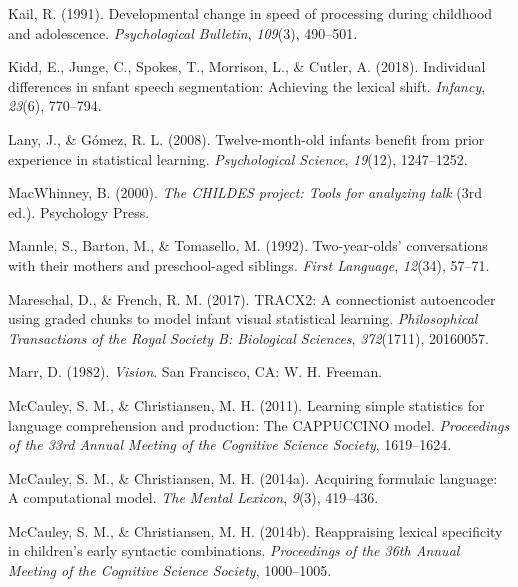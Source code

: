 \documentclass[
  english,
  man,floatsintext]{apa6}
\begin{document}
\leavevmode\hypertarget{ref-kail1991developmental}{}%
Kail, R. (1991). Developmental change in speed of processing during childhood and adolescence. \emph{Psychological Bulletin}, \emph{109}(3), 490--501.

\leavevmode\hypertarget{ref-kidd2018individual}{}%
Kidd, E., Junge, C., Spokes, T., Morrison, L., \& Cutler, A. (2018). Individual differences in snfant speech segmentation: Achieving the lexical shift. \emph{Infancy}, \emph{23}(6), 770--794.

\leavevmode\hypertarget{ref-lany2008twelve}{}%
Lany, J., \& Gómez, R. L. (2008). Twelve-month-old infants benefit from prior experience in statistical learning. \emph{Psychological Science}, \emph{19}(12), 1247--1252.

\leavevmode\hypertarget{ref-childes}{}%
MacWhinney, B. (2000). \emph{The CHILDES project: Tools for analyzing talk} (3rd ed.). Psychology Press.

\leavevmode\hypertarget{ref-mannle1992twoyearolds}{}%
Mannle, S., Barton, M., \& Tomasello, M. (1992). Two-year-olds' conversations with their mothers and preschool-aged siblings. \emph{First Language}, \emph{12}(34), 57--71.

\leavevmode\hypertarget{ref-mareschal2017tracx2}{}%
Mareschal, D., \& French, R. M. (2017). TRACX2: A connectionist autoencoder using graded chunks to model infant visual statistical learning. \emph{Philosophical Transactions of the Royal Society B: Biological Sciences}, \emph{372}(1711), 20160057.

\leavevmode\hypertarget{ref-marr1982vision}{}%
Marr, D. (1982). \emph{Vision}. San Francisco, CA: W. H. Freeman.

\leavevmode\hypertarget{ref-mccauley2011learning}{}%
McCauley, S. M., \& Christiansen, M. H. (2011). Learning simple statistics for language comprehension and production: The CAPPUCCINO model. \emph{Proceedings of the 33rd Annual Meeting of the Cognitive Science Society}, 1619--1624.

\leavevmode\hypertarget{ref-mccauley2014acquiring}{}%
McCauley, S. M., \& Christiansen, M. H. (2014a). Acquiring formulaic language: A computational model. \emph{The Mental Lexicon}, \emph{9}(3), 419--436.

\leavevmode\hypertarget{ref-mccauley2014reappraising}{}%
McCauley, S. M., \& Christiansen, M. H. (2014b). Reappraising lexical specificity in children's early syntactic combinations. \emph{Proceedings of the 36th Annual Meeting of the Cognitive Science Society}, 1000--1005.
\end{document}
